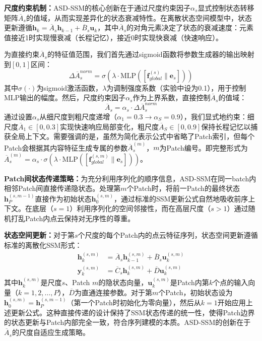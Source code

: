\documentclass[preprint,12pt]{elsarticle}
\begin{document}
\textbf{尺度约束机制：}ASD-SSM的核心创新在于通过尺度约束因子$\alpha_s$显式控制状态转移矩阵$\overline{A}_s$的值域，从而实现差异化的状态衰减特性。在离散状态空间模型中，状态更新遵循$\mathbf{h}_k = \overline{A}_s \mathbf{h}_{k-1} + \overline{B}_s \mathbf{u}_k$，其中$\overline{A}_s$的对角元素决定了状态的衰减速度：元素值接近1时实现慢衰减（长程记忆），接近0时实现快衰减（快速响应）。

为直接约束$\overline{A}_s$的特征值范围，我们首先通过sigmoid函数将参数生成器的输出映射到$[0,1]$区间：
\begin{equation}
	\Delta\overline{A}_s^{norm} = \sigma(\lambda \cdot \text{MLP}([\mathbf{f}_{global}^{(s)} \| \mathbf{e}_s]))
	\label{eq:param_norm}
\end{equation}
其中$\sigma(\cdot)$为sigmoid激活函数，$\lambda$为调制强度系数（实验中设为0.1），用于控制MLP输出的幅度。然后，尺度约束因子$\alpha_s$作为上界系数，直接控制$\overline{A}_s$的值域：
\begin{equation}
	\overline{A}_s = \alpha_s \cdot \Delta\overline{A}_s^{norm}
	\label{eq:param_modulation}
\end{equation}
通过设置$\alpha_s$从细尺度到粗尺度递增（$\alpha_1=0.3 \rightarrow \alpha_S=0.9$），我们显式地约束：细尺度$\overline{A}_1 \in [0, 0.3]$实现快速响应局部变化，粗尺度$\overline{A}_S \in [0, 0.9]$保持长程记忆以捕获全局上下文。需要强调的是，虽然为简化表示公式中省略了Patch索引，但每个Patch会根据其内容特征生成专属的参数$\overline{A}_s^{(m)}$，$m$为Patch编号。即完整形式为$\overline{A}_s^{(m)} = \alpha_s \cdot \sigma(\lambda \cdot \text{MLP}([\mathbf{f}_{global}^{(s,m)} \| \mathbf{e}_s]))$。

\textbf{Patch间状态传递策略：}为充分利用序列化的顺序信息，ASD-SSM在同一batch内相邻Patch间直接传递隐状态。处理第$m$个Patch时，将前一Patch的最终状态$\mathbf{h}_P^{(s,m-1)}$直接作为初始状态$\mathbf{h}_0^{(s,m)}$，通过标准的SSM更新公式自然地吸收前序上下文。在底层（$s=1$）利用序列化的空间邻接性，而在高层尺度（$s>1$）通过随机打乱Patch内点云保持对无序性的尊重。

\textbf{状态空间更新：}对于第$s$个尺度的每个Patch内的点云特征序列，状态空间更新遵循标准的离散化SSM形式\cite{Mamba}：
\begin{equation}
	\begin{aligned}
		\mathbf{h}_k^{(s,m)} &= \overline{A}_s \mathbf{h}_{k-1}^{(s,m)} + \overline{B}_s \mathbf{u}_k^{(s,m)} \\
		\mathbf{y}_k^{(s,m)} &= \overline{C}_s \mathbf{h}_k^{(s,m)} + \overline{D} \mathbf{u}_k^{(s,m)}
	\end{aligned}
	\label{eq:asd_ssm_update}
\end{equation}
其中$\mathbf{h}_k^{(s,m)}$是尺度$s$、Patch $m$的隐状态向量，$\mathbf{u}_k^{(s,m)}$是Patch内第$k$个点的输入向量（$k=1,2,\ldots,P$），$\overline{D}$为直通连接参数。对于第$m$个Patch，初始状态设为$\mathbf{h}_0^{(s,m)} = \mathbf{h}_P^{(s,m-1)}$（第一个Patch时初始化为零向量），然后从$k=1$开始应用上述更新公式。这种直接传递的设计保持了SSM状态传递的统一性，使得Patch边界的状态更新与Patch内部完全一致，符合序列建模的本质。ASD-SSM的创新在于$\overline{A}_s$的尺度自适应生成策略。
\end{document}
